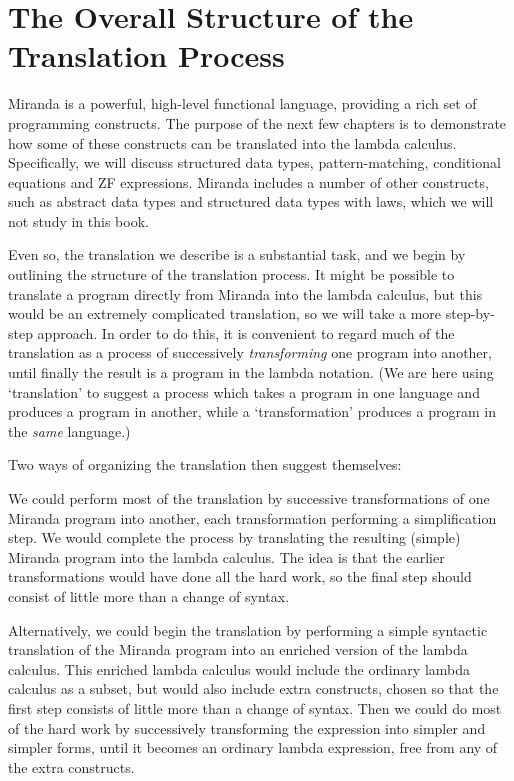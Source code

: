 \section{The Overall Structure of the Translation Process}
Miranda is a powerful, high-level functional language, providing a rich set of programming constructs. The purpose of the next few chapters is to demonstrate how some of these constructs can be translated into the lambda calculus. Specifically, we will discuss structured data types, pattern-matching, conditional equations and ZF expressions. Miranda includes a number of other constructs, such as abstract data types and structured data types with laws, which we will not study in this book.

Even so, the translation we describe is a substantial task, and we begin by outlining the structure of the translation process. It might be possible to translate a program directly from Miranda into the lambda calculus, but this would be an extremely complicated translation, so we will take a more step-by-step approach. In order to do this, it is convenient to regard much of the translation as a process of successively \textit{transforming} one program into another, until finally the result is a program in the lambda notation. (We are here using `translation' to suggest a process which takes a program in one language and produces a program in another, while a `transformation' produces a program in the \textit{same} language.)

Two ways of organizing the translation then suggest themselves:

\begin{numbered}
    \item We could perform most of the translation by successive transformations of one Miranda program into another, each transformation performing a simplification step. We would complete the process by translating the resulting (simple) Miranda program into the lambda calculus. The idea is that the earlier transformations would have done all the hard work, so the final step should consist of little more than a change of syntax.

    \item Alternatively, we could begin the translation by performing a simple syntactic translation of the Miranda program into an enriched version of the lambda calculus. This enriched lambda calculus would include the ordinary lambda calculus as a subset, but would also include extra constructs, chosen so that the first step consists of little more than a change of syntax. Then we could do most of the hard work by successively transforming the expression into simpler and simpler forms, until it becomes an ordinary lambda expression, free from any of the extra constructs.
\end{numbered}

